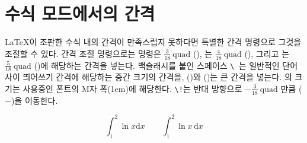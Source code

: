\section{수식 모드에서의 간격}
\label{sec:math-spacing}

\LaTeX 이 조판한 수식 내의 간격이 만족스럽지 못하다면 특별한 간격 명령으로 그것을 조절할 수 있다.
간격 조절 명령으로는 
\ci{,} 명령은 $\frac{3}{18}\:\textrm{quad}$
(\demowidth{0.166em}), \ci{:}는 $\frac{4}{18}\: \textrm{quad}$
(\demowidth{0.222em}), 그리고 \ci{;}는 $\frac{5}{18}\: \textrm{quad}$
(\demowidth{0.277em})에 해당하는 간격을 넣는다.
백슬래시를 붙인 스페이스 \verb*|\ |는 일반적인 단어 사이 띄어쓰기 간격에 해당하는 중간 크기의 간격을, 
 (\demowidth{1em})와  (\demowidth{2em})는 큰 간격을 넣는다.
의 크기는 사용중인 폰트의 M자 폭(1em)에 해당한다. \verb|\!|는 반대 방향으로 $-\frac3{18}\:\text{quad}$ 만큼
($-$\demowidth{0.166em})을 이동한다.

\begin{example}
\begin{equation*}
  \int_1^2 \ln x \mathrm{d}x 
  \qquad
  \int_1^2 \ln x \,\mathrm{d}x
\end{equation*}
\end{example}

